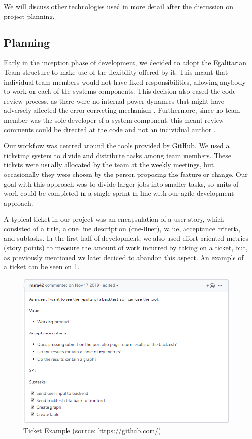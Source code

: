 \documentclass[main.tex]{subfiles}
\begin{document}
We will discuss other technologies used in more detail after the discussion on project planning.

\subsection{Planning}

Early in the inception phase of development, we decided to adopt the Egalitarian Team structure to make use of the flexibility offered by it. This meant that individual team members would not have fixed responsibilities, allowing anybody to work on each of the systems components. This decision also eased the code review process, as there were no internal power dynamics that might have adversely affected the error-correcting mechanism \cite{statusdifference}. Furthermore, since no team member was the sole developer of a system component, this meant review comments could be directed at the code and not an individual author \cite{howtoreview}. 

Our workflow was centred around the tools provided by GitHub. We used a ticketing system to divide and distribute tasks among team members. These tickets were usually allocated by the team at the weekly meetings, but occasionally they were chosen by the person proposing the feature or change. Our goal with this approach was to divide larger jobs into smaller tasks, so units of work could be completed in a single sprint in line with our agile development approach.

A typical ticket in our project was an encapsulation of a user story, which consisted of a title, a one line description (one-liner), value, acceptance criteria, and subtasks. In the first half of development, we also used effort-oriented metrics (story points) to measure the amount of work incurred by taking on a ticket, but, as previously mentioned we later decided to abandon this aspect. An example of a ticket can be seen on \figurename{\ref{Ticket}}.

\begin{figure}[H]
   \centering
   \includegraphics[scale=0.7]{05Coding/05Pictures/ticket.png}
   \caption{Ticket Example (source: https://github.com/)}
   \label{Ticket}
\end{figure}
\end{document}
